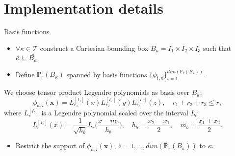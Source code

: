 \documentclass{beamer}
\begin{document}
\section{Implementation details}
\begin{frame}{Basis functions}
	\begin{itemize}
		\item $\forall \kappa \in \mathcal{T}$ construct a Cartesian bounding 
		box $B_\kappa=I_1\times I_2 \times I_3$ such that $\bar{\kappa} \subseteq 
		\bar{B_\kappa}$.
		\pause
		\item Define $\mathbb{P}_r(B_\kappa)$ spanned by basis
		functions $\{ \phi_{i,\kappa} \}_{i=1}^{dim(\mathbb{P}_r(B_\kappa))}$.
	\end{itemize}
	We choose tensor product Legendre polynomials as basis over $B_\kappa$:
	\begin{equation*}
		\phi_{\kappa,i}(\mathbf{x}) =
		L_{r_1}^{[I_1]}(x)L_{r_2}^{[I_2]}(y)L_{r_3}^{[I_3]}(z), \quad
		r_1+r_2+r_3 \leq r,
	\end{equation*}
	where $L_r^{[I_b]}$ is a Legendre polynomial scaled over the interval $I_b$:
	\begin{equation*}
	L_r^{[I_b]} (x) = \frac{1}{\sqrt{h_b}} L_r \bigg( \frac{x-m_b}{h_b} \bigg),
	\quad h_b = \frac{x_2-x_1}{2}, \quad m_b=\frac{x_1+x_2}{2}.
	\end{equation*}
	\pause
	\begin{itemize}
		\item Restrict the support of $\phi_{\kappa, i}(\mathbf{x}), \;
		i=1,\dots,dim(\mathbb{P}_r(B_\kappa))$ to $\kappa$.
	\end{itemize}
\end{frame}
\end{document}
